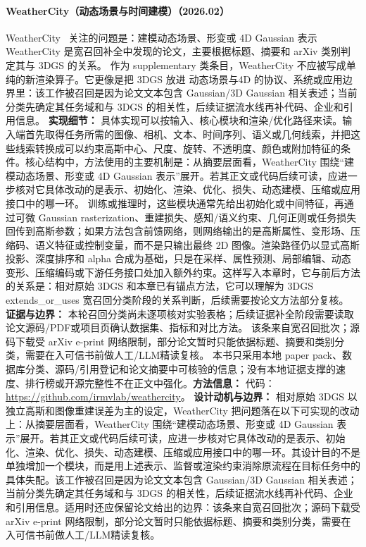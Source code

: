 \paragraph{WeatherCity（动态场景与时间建模）（2026.02）}
WeatherCity~\cite{2602_22096} 关注的问题是：建模动态场景、形变或 4D Gaussian 表示 WeatherCity 是宽召回补全中发现的论文，主要根据标题、摘要和 arXiv 类别判定其与 3DGS 的关系。
作为 supplementary 类条目，WeatherCity 不应被写成单纯的新渲染算子。它更像是把 3DGS 放进 动态场景与4D 的协议、系统或应用边界里：该工作被召回是因为论文文本包含 Gaussian/3D Gaussian 相关表述；当前分类先确定其任务域和与 3DGS 的相关性，后续证据流水线再补代码、企业和引用信息。
\textbf{实现细节：} 具体实现可以按输入、核心模块和渲染/优化路径来读。输入端首先取得任务所需的图像、相机、文本、时间序列、语义或几何线索，并把这些线索转换成可以约束高斯中心、尺度、旋转、不透明度、颜色或附加特征的条件。核心结构中，方法使用的主要机制是：从摘要层面看，WeatherCity 围绕“建模动态场景、形变或 4D Gaussian 表示”展开。若其正文或代码后续可读，应进一步核对它具体改动的是表示、初始化、渲染、优化、损失、动态建模、压缩或应用接口中的哪一环。 训练或推理时，这些模块通常先给出初始化或中间特征，再通过可微 Gaussian rasterization、重建损失、感知/语义约束、几何正则或任务损失回传到高斯参数；如果方法包含前馈网络，则网络输出的是高斯属性、变形场、压缩码、语义特征或控制变量，而不是只输出最终 2D 图像。渲染路径仍以显式高斯投影、深度排序和 alpha 合成为基础，只是在采样、属性预测、局部编辑、动态变形、压缩编码或下游任务接口处加入额外约束。这样写入本章时，它与前后方法的关系是：相对原始 3DGS 和本章已有锚点方法，它可以理解为 3DGS extends\_or\_uses 宽召回分类阶段的关系判断，后续需要按论文方法部分复核。
\textbf{证据与边界：} 本轮召回分类尚未逐项核对实验表格；后续证据补全阶段需要读取论文源码/PDF或项目页确认数据集、指标和对比方法。 该条来自宽召回批次；源码下载受 arXiv e-print 网络限制，部分论文暂时只能依据标题、摘要和类别分类，需要在入可信书前做人工/LLM精读复核。 本书只采用本地 paper pack、数据库分类、源码/引用登记和论文摘要中可核验的信息；没有本地证据支撑的速度、排行榜或开源完整性不在正文中强化。\textbf{方法信息：} 代码：\url{https://github.com/irmvlab/weathercity}。
\textbf{设计动机与边界：} 相对原始 3DGS 以独立高斯和图像重建误差为主的设定，WeatherCity 把问题落在以下可实现的改动上：从摘要层面看，WeatherCity 围绕“建模动态场景、形变或 4D Gaussian 表示”展开。若其正文或代码后续可读，应进一步核对它具体改动的是表示、初始化、渲染、优化、损失、动态建模、压缩或应用接口中的哪一环。其设计目的不是单独增加一个模块，而是用上述表示、监督或渲染约束消除原流程在目标任务中的具体失配。该工作被召回是因为论文文本包含 Gaussian/3D Gaussian 相关表述；当前分类先确定其任务域和与 3DGS 的相关性，后续证据流水线再补代码、企业和引用信息。适用时还应保留论文给出的边界：该条来自宽召回批次；源码下载受 arXiv e-print 网络限制，部分论文暂时只能依据标题、摘要和类别分类，需要在入可信书前做人工/LLM精读复核。
